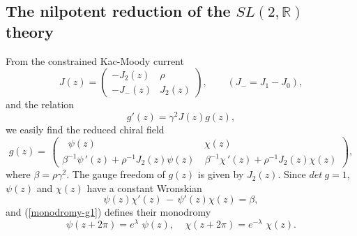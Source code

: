 \documentclass[a4paper,12pt]{article}
\newcommand{\rr}{\mathbb{R}}
\begin{document}
\subsection{The nilpotent reduction of the $SL(2,\rr)$ theory}

\noindent
From the constrained Kac-Moody current
\begin{equation}\label{constrained-T-J}
J(z)= \left( \begin{array}{cr}
 -J_2(z)& \rho~~\\
-J_-(z)& J_2(z) \end{array}\right), ~~~~~~~~~
(J_-=J_1-J_0),
\end{equation}
and the relation
\begin{equation}\label{g-J}
g'(z)=\gamma^2J(z)g(z),
\end{equation}
we easily find the reduced chiral field
\begin{equation}\label{constrained-g}
  g(z)=\,\left( \begin{array}{cr}
 ~~\,\psi(z)~~~&\,\chi(z)~~~~~~~~\\
\beta^{-1}\psi\,'(z)+\rho^{-1} J_2(z)\psi(z) &
~\beta^{-1}\chi\,'(z)+\rho^{-1} J_2(z)\chi(z)
\end{array}\right),
\end{equation}
where $\beta =\rho\gamma^2$. The gauge freedom of $g(z)$ is
given  by
$J_2(z)$. Since $det~ g=1$,  $\psi(z)$ and $\chi(z)$ have a
constant Wronskian
\begin{equation}\label{wronskian}
\psi(z)\chi'(z)\,-\,\psi'(z)\chi(z)=\beta ,
\end{equation}
and (\ref{monodromy-g1}) defines  their
monodromy
\begin{equation}\label{monodromy-psi}
\psi(z+2\pi)=e^\lambda\,\,\psi(z),~~~~~
\chi(z+2\pi)=e^{-\lambda}\,\,\chi(z).
\end{equation}
\end{document}
